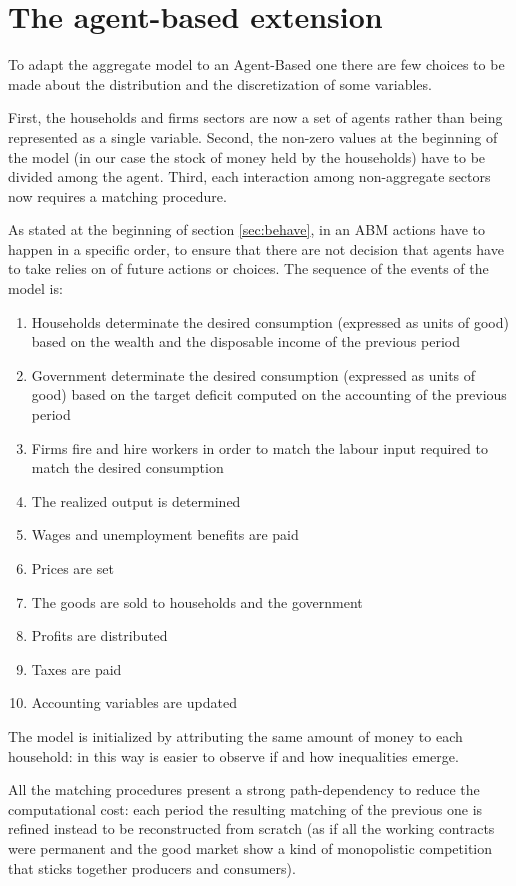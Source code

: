 \section{The agent-based extension}
To adapt the aggregate model to an Agent-Based one there are few choices to be made about the distribution and the discretization of some variables.

First, the households and firms sectors are now a set of agents rather than being represented as a single variable.
Second, the non-zero values at the beginning of the model (in our case the stock of money held by the households) have to be divided among the agent.
Third, each interaction among non-aggregate sectors now requires a matching procedure.

As stated at the beginning of section \ref{sec:behave}, in an ABM actions have to happen in a specific order, to ensure that there are not decision that agents have to take relies on of future actions or choices.
The sequence of the events of the model is:
\begin{enumerate}[label=\textbf{\Alph*}]
    \item Households determinate the desired consumption (expressed as units of good) based on the wealth and the disposable income of the previous period
    \item Government determinate the desired consumption (expressed as units of good) based on the target deficit computed on the accounting of the previous period
    \item Firms fire and hire workers in order to match the labour input required to match the desired consumption
    \item The realized output is determined
    \item Wages and unemployment benefits are paid
    \item Prices are set
    \item The goods are sold to households and the government
    \item Profits are distributed
    \item Taxes are paid
    \item Accounting variables are updated
\end{enumerate}

The model is initialized by attributing the same amount of money to each household: in this way is easier to observe if and how inequalities emerge.

All the matching procedures present a strong path-dependency to reduce the computational cost: each period the resulting matching of the previous one is refined instead to be reconstructed from scratch (as if all the working contracts were permanent and the good market show a kind of monopolistic competition that sticks together producers and consumers).

